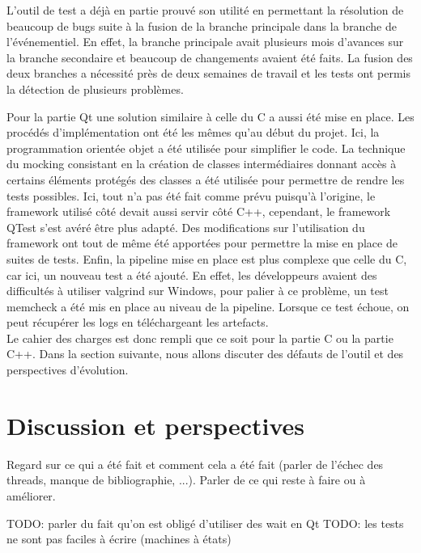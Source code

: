 \documentclass[a4paper]{article}
\begin{document}
L'outil de test a déjà en partie prouvé son utilité en permettant la résolution
de beaucoup de bugs suite à la fusion de la branche principale dans la branche
de l'événementiel. En effet, la branche principale avait plusieurs mois d'avances sur
la branche secondaire et beaucoup de changements avaient été faits. La fusion des
deux branches a nécessité près de deux semaines de travail et les tests ont
permis la détection de plusieurs problèmes.

Pour la partie Qt une solution similaire à celle du C a aussi été mise en place.
Les procédés d'implémentation ont été les mêmes qu'au début du projet. Ici, la
programmation orientée objet a été utilisée pour simplifier le code. La
technique du mocking consistant en la création de classes intermédiaires donnant
accès à certains éléments protégés des classes a été utilisée pour permettre de
rendre les tests possibles. Ici, tout n'a pas été fait comme prévu puisqu'à
l'origine, le framework utilisé côté devait aussi servir côté C++, cependant, le
framework QTest s'est avéré être plus adapté. Des modifications sur
l'utilisation du framework ont tout de même été apportées pour permettre la mise
en place de suites de tests. Enfin, la pipeline mise en place est plus complexe
que celle du C, car ici, un nouveau test a été ajouté. En effet, les développeurs
avaient des difficultés à utiliser valgrind sur Windows, pour palier à ce
problème, un test memcheck a été mis en place au niveau de la pipeline. Lorsque
ce test échoue, on peut récupérer les logs en téléchargeant les artefacts.\\

Le cahier des charges est donc rempli que ce soit pour la partie C ou la partie
C++. Dans la section suivante, nous allons discuter des défauts de l'outil et des
perspectives d'évolution.

\clearpage

\section{Discussion et perspectives}

Regard sur ce qui a été fait et comment cela a été fait (parler de l'échec
des threads, manque de bibliographie, ...). Parler de ce qui reste à faire ou à
améliorer.

TODO: parler du fait qu'on est obligé d'utiliser des wait en Qt
TODO: les tests ne sont pas faciles à écrire (machines à états)

\clearpage
\end{document}
